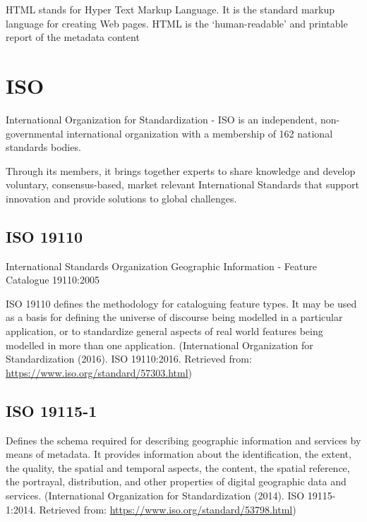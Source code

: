 \documentclass[
]{book}
\begin{document}
HTML stands for Hyper Text Markup Language. It is the standard markup language for creating Web pages. HTML is the `human-readable' and printable report of the metadata content

\hypertarget{iso}{%
\section*{ISO}\label{iso}}

International Organization for Standardization - ISO is an independent, non-governmental international organization with a membership of 162 national standards bodies.

Through its members, it brings together experts to share knowledge and develop voluntary, consensus-based, market relevant International Standards that support innovation and provide solutions to global challenges.

\hypertarget{iso-19110}{%
\subsection*{ISO 19110}\label{iso-19110}}

International Standards Organization Geographic Information - Feature Catalogue 19110:2005

ISO 19110 defines the methodology for cataloguing feature types. It may be used as a basis for defining the universe of discourse being modelled in a particular application, or to standardize general aspects of real world features being modelled in more than one application. (International Organization for Standardization (2016). ISO 19110:2016. Retrieved from: \url{https://www.iso.org/standard/57303.html})

\hypertarget{iso-19115-1}{%
\subsection*{ISO 19115-1}\label{iso-19115-1}}

Defines the schema required for describing geographic information and services by means of metadata. It provides information about the identification, the extent, the quality, the spatial and temporal aspects, the content, the spatial reference, the portrayal, distribution, and other properties of digital geographic data and services. (International Organization for Standardization (2014). ISO 19115-1:2014. Retrieved from: \url{https://www.iso.org/standard/53798.html})
\end{document}
